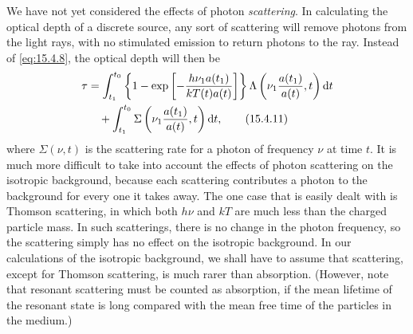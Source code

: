We have not yet considered the effects of photon \emph{scattering}. In
calculating the optical depth of a discrete source, any sort of scattering will
remove photons from the light rays, with no stimulated emission to return
photons to the ray. Instead of \eqref{eq:15.4.8}, the optical depth will then
be
\begin{align}
  \tau
  &=
  \int_{t_1}^{t_0}
  \left\{
    1-\exp\left[
      -\frac{h\nu_1a(t_1)}{kT(t)a(t)}
    \right]
  \right\}
  \Lambda\left(\nu_1\frac{a(t_1)}{a(t)},t\right)\mathop{}\!\mathrm{d} t
  \notag\\
  &\quad+
  \int_{t_1}^{t_0}
  \Sigma\left(\nu_1\frac{a(t_1)}{a(t)},t\right)\mathop{}\!\mathrm{d} t,
  \tag{15.4.11}\label{eq:15.4.11}
\end{align}
where \(\Sigma(\nu,t)\) is the scattering rate for a photon of frequency
\(\nu\) at time \(t\). It is much more difficult to take into account the
effects of photon scattering on the isotropic background, because each
scattering contributes a photon to the background for every one it takes away.
The one case that is easily dealt with is Thomson scattering, in which both
\(h\nu\) and \(kT\) are much less than the charged particle mass. In such
scatterings, there is no change in the photon frequency, so the scattering
simply has no effect on the isotropic background. In our calculations of the
isotropic background, we shall have to assume that scattering, except for
Thomson scattering, is much rarer than absorption. (However, note that
resonant scattering must be counted as absorption, if the mean lifetime of the
resonant state is long compared with the mean free time of the particles in the
medium.)

